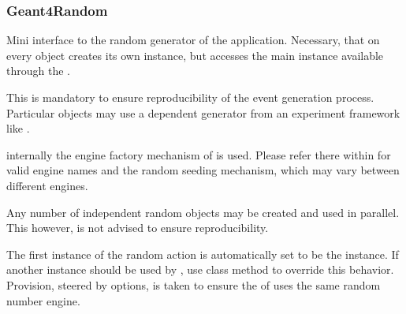 \subsubsection{Geant4Random}
\noindent
Mini interface to the random generator of the application.
Necessary, that on every object creates its own instance, but accesses
the main instance available through the .

\noindent
This is mandatory to ensure reproducibility of the event generation
process. Particular objects may use a dependent generator from
an experiment framework like .

\noindent
internally the engine factory mechanism of  is used. Please refer
there within for valid engine names and the random seeding mechanism,
which may vary between different engines.

\noindent
Any number of independent random objects may be created and used 
in parallel. This however, is not advised to ensure reproducibility.

\noindent
The first instance of the random action is automatically set
to be the  instance. If another instance should be used by 
, use  class method to 
override this behavior.
Provision, steered by options, is taken to ensure the 
of  uses the same random number engine.

